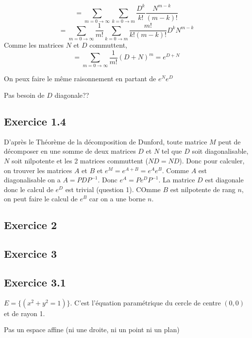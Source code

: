 \documentclass[]{book}
\theoremstyle{definition}
\begin{document}
$$
= \sum_{m = 0 \to \infty}\sum_{k = 0 \to m}{\frac{D^k}{k!}\frac{N^{m-k}}{(m-k)!}}
$$
$$
= \sum_{m = 0 \to \infty}\frac{1}{m!}\sum_{k = 0 \to m}{\frac{m!}{k!(m-k)!}D^kN^{m-k}}
$$
Comme les matrices $N$ et $D$ commuttent,
$$
= \sum_{m = 0 \to \infty}{\frac{1}{m!}(D+N)^m} = e^{D+N}
$$

On peux faire le m\^eme raisonnement en partant de $e^Ne^D$

Pas besoin de $D$ diagonale??

\subsection*{Exercice 1.4}
D'apr\`es le Th\'eor\`eme de la d\'ecomposition de Dunford, toute matrice $M$ peut de d\'ecomposer en une somme de deux matrices $D$ et $N$ tel que $D$ soit diagonalisable, $N$ soit nilpotente et les 2 matrices commuttent ($ND = ND$).
Donc pour calculer, on trouver les matrices $A$ et $B$ et $e^M= e^{A+B} = e^Ae^B$. Comme $A$ est diagonalisable on a $A=PDP^{-1}$. Donc $e^A = Pe^DP^{-1}$. La matrice $D$ est diagonale donc le calcul de $e^D$ est trivial (question 1). COmme $B$ est nilpotente de rang $n$, on peut faire le calcul de $e^B$ car on a une borne $n$.

\subsection*{Exercice 2}


\subsection*{Exercice 3}
\subsection*{Exercice 3.1}
$E= \{ (x^2 + y^2 = 1)\}$. C'est l'\'equation param\'etrique du cercle de centre $(0,0)$ et de rayon 1.


Pas un espace affine (ni une droite, ni un point ni un plan)
\end{document}
